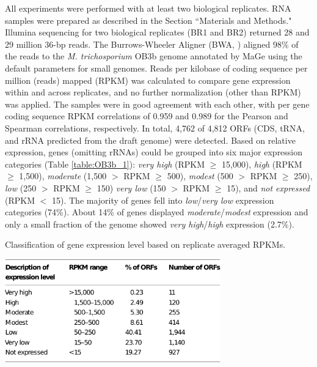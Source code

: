 All experiments were performed with at least two biological replicates.
RNA samples were prepared as described in the Section ``Materials and Methods."
Illumina sequencing for two biological replicates (BR1 and BR2) returned 28 and 29 million 36-bp reads.
The Burrows-Wheeler Aligner (BWA, \cite{li2009}) aligned 98\% of the reads to the \textit{M. trichosporium} OB3b genome annotated by MaGe \cite{vallenet2006} using the default parameters for small genomes.
Reads per kilobase of coding sequence per million (reads) mapped (RPKM) \cite{mortazavi2008} was calculated to compare gene expression within and across replicates, and no further normalization (other than RPKM) was applied.
The samples were in good agreement with each other, with per gene coding sequence RPKM correlations of 0.959 and 0.989 for the Pearson and Spearman correlations, respectively.
In total, 4,762 of 4,812 ORFs (CDS, tRNA, and rRNA predicted from the draft genome) were detected.
Based on relative expression, genes (omitting rRNAs) could be grouped into six major expression categories (Table \ref{table:OB3b_1}): \textit{very high} (RPKM $\geq$ 15,000), \textit{high} (RPKM $\geq$ 1,500), \textit{moderate} (1,500 $>$ RPKM $\geq$ 500), \textit{modest} (500 $>$ RPKM $\geq$ 250), \textit{low} (250 $>$ RPKM $\geq$ 150) \textit{very low} (150 $>$ RPKM $\geq$ 15), and \textit{not expressed} (RPKM $<$ 15).
The majority of genes fell into \textit{low}/\textit{very low} expression categories (74\%).
About 14\% of genes displayed \textit{moderate}/\textit{modest} expression and only a small fraction of the genome showed \textit{very high}/\textit{high} expression (2.7\%).

\begin{table}[H]
    \caption[Classification of gene expression level based on replicate averaged RPKMs]
        {Classification of gene expression level based on replicate averaged RPKMs.}
    \centering
     \includegraphics[width=0.7\textwidth]{./tex/chapter1/figures/matsen_OB3b_table1--no_header.pdf}
     \label{table:OB3b_1} %
     \begin{singlespace}
     \end{singlespace}
\end{table}



